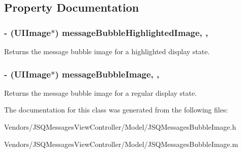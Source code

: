 \subsection{Property Documentation}
\hypertarget{interface_j_s_q_messages_bubble_image_acf8df32f421b6e308e528f0bdab65617}{}
\subsubsection[{message\+Bubble\+Highlighted\+Image}]{\setlength{\rightskip}{0pt plus 5cm}-\/ (U\+I\+Image$\ast$) message\+Bubble\+Highlighted\+Image\hspace{0.3cm}{\ttfamily [read]}, {\ttfamily [nonatomic]}, {\ttfamily [strong]}}\label{interface_j_s_q_messages_bubble_image_acf8df32f421b6e308e528f0bdab65617}
Returns the message bubble image for a highlighted display state. \hypertarget{interface_j_s_q_messages_bubble_image_a6780a193bff2e635e1e224832bd7178a}{}
\subsubsection[{message\+Bubble\+Image}]{\setlength{\rightskip}{0pt plus 5cm}-\/ (U\+I\+Image$\ast$) message\+Bubble\+Image\hspace{0.3cm}{\ttfamily [read]}, {\ttfamily [nonatomic]}, {\ttfamily [strong]}}\label{interface_j_s_q_messages_bubble_image_a6780a193bff2e635e1e224832bd7178a}
Returns the message bubble image for a regular display state. 

The documentation for this class was generated from the following files\+:\begin{DoxyCompactItemize}
\item 
Vendors/\+J\+S\+Q\+Messages\+View\+Controller/\+Model/J\+S\+Q\+Messages\+Bubble\+Image.\+h\item 
Vendors/\+J\+S\+Q\+Messages\+View\+Controller/\+Model/J\+S\+Q\+Messages\+Bubble\+Image.\+m\end{DoxyCompactItemize}
